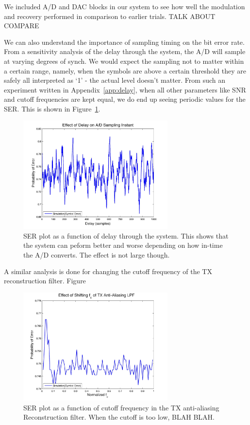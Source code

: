 \documentclass[]{article}
\begin{document}
We included A/D and DAC blocks in our system to see how well the modulation and recovery performed in comparison to earlier trials.  TALK ABOUT COMPARE

We can also understand the importance of sampling timing on the bit error rate.  From a sensitivity analysis of the delay through the system, the A/D will sample at varying degrees of synch.  We would expect the sampling not to matter within a certain range, namely, when the symbols are above a certain threshold they are safely all interpreted as `1' - the actual level doesn't matter.  From such an experiment written in Appendix~\ref{app:delay}, when all other parameters like SNR and cutoff frequencies are kept equal, we do end up seeing periodic values for the SER.  This is shown in Figure~\ref{fig:delay}.\\

\begin{figure}[H]
\centering
\hspace*{-2cm}\includegraphics[width=0.7\textwidth]{delaySensitivity.jpg}
\caption{SER plot as a function of delay through the system.  This shows that the system can peform better and worse depending on how in-time the A/D converts.  The effect is not large though. \label{fig:delay}}
\end{figure}

A similar analysis is done for changing the cutoff frequency of the TX reconstruction filter. Figure

\begin{figure}[H]
\centering
\hspace*{-2cm}\includegraphics[width=0.7\textwidth]{freqTX.jpg}
\caption{SER plot as a function of cutoff frequency in the TX anti-aliasing Reconstruction filter.  When the cutoff is too low, BLAH BLAH. \label{fig:freqTX}}
\end{figure}
\end{document}
